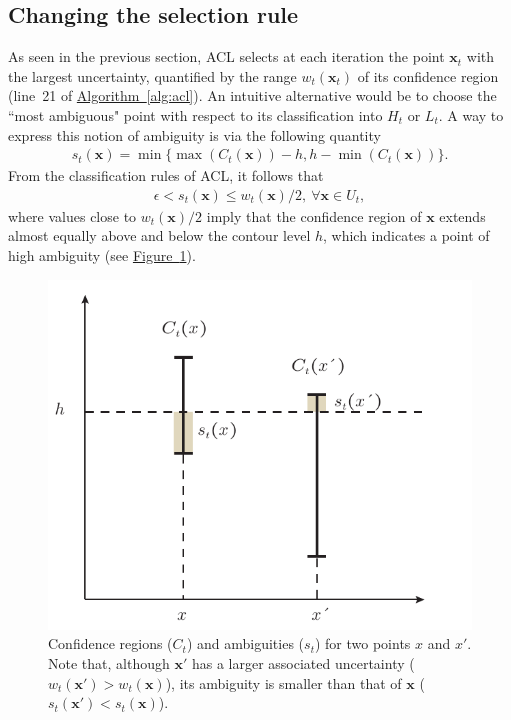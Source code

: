 \documentclass{article}
\def\*#1{\bm{#1}}
\newcommand{\figref}[1]{\hyperref[#1]{\mbox{Figure~\ref*{#1}}}}
\newcommand{\algoref}[1]{\hyperref[#1]{\mbox{Algorithm~\ref*{#1}}}}
\newcommand{\acl}{\textsf{ACL}\xspace}
\begin{document}
\subsection{Changing the selection rule}
As seen in the previous section, \acl selects at each iteration
the point $\*x_t$ with the largest uncertainty,
quantified by the range $w_t(\*x_t)$ of its confidence region
(line~21 of \algoref{alg:acl}).
An intuitive alternative would be to choose the ``most ambiguous" point with
respect to its classification into $H_t$ or $L_t$. A way to express this
notion of ambiguity is via the following quantity
\begin{align*}
s_t(\*x) = \min\{\max(C_t(\*x)) - h, h - \min(C_t(\*x))\}.
\end{align*}
From the classification rules of \acl, it follows that
\begin{align*}
\epsilon < s_t(\*x) \leq w_t(\*x)/2,\ \forall \*x \in U_t,
\end{align*}
where values close to $w_t(\*x)/2$ imply that the confidence region of $\*x$
extends almost equally above and below the contour level $h$, which indicates
a point of high ambiguity (see \figref{fig:amb}).

\begin{figure}[tb]
\begin{center}
\centerline{\includegraphics[width=0.9\columnwidth]{figures/amb}}
\caption{Confidence regions ($C_t$) and ambiguities
($s_t$) for two points $x$ and $x'$. Note that, although $\*x'$
has a larger associated uncertainty ($w_t(\*x') > w_t(\*x)$),
its ambiguity is smaller than that of $\*x$ ($s_t(\*x') < s_t(\*x)$).
}
\label{fig:amb}
\end{center}
\end{figure} 
\end{document}
